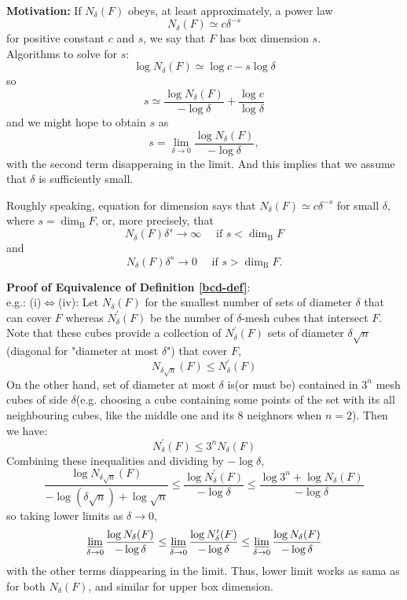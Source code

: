 \documentclass[12pt, a4paper]{article}
\begin{document}
\textbf{Motivation:}
If $N_\delta(F)$ obeys, at least approximately, a power law
$$N_{\delta}(F) \simeq c \delta^{-s}$$
for positive constant $c$ and $s$, we say that $F$ has box dimension $s$.
\\
Algorithms to solve for $s$:
$$
\log N_{\delta}(F) \simeq \log c-s \log \delta
$$
so
$$
s \simeq \frac{\log N_{\delta}(F)}{-\log \delta}+\frac{\log c}{\log \delta}
$$
and we might hope to obtain $s$ as
$$
s=\lim _{\delta \rightarrow 0} \frac{\log N_{\delta}(F)}{-\log \delta},
$$
with the second term disapperaing in the limit. And this implies that we assume that $\delta$ is sufficiently small. 


Roughly speaking, equation for dimension says that $N_{\delta}(F) \simeq c \delta^{-s}$ for small $\delta$, where $s=\operatorname{dim}_{\mathrm{B}} F$, or, more precisely, that
$$
N_{\delta}(F) \delta^{s} \rightarrow \infty \quad \text { if } s<\operatorname{dim}_{\mathrm{B}} F
$$
and
$$
N_{\delta}(F) \delta^{s} \rightarrow 0 \quad \text { if } s>\operatorname{dim}_{\mathrm{B}} F .
$$

\textbf{Proof of Equivalence of Definition \ref{bcd-def}}:\\
e.g.: (i)$\Leftrightarrow$(iv): Let $N_\delta(F)$ for the smallest number of sets of diameter $\delta$ that can cover $F$ whereas $N_\delta^\prime(F)$ be the number of $\delta$-mesh cubes that intersect $F$. 
Note that these cubes provide a collection of $N_\delta^\prime(F)$ sets of diameter $\delta\sqrt{n}$(diagonal for "diameter at most $\delta$") that cover $F$, $$N_{\delta\sqrt{n}}(F)\leq N_\delta^\prime(F)$$
On the other hand, set of diameter at most $\delta$ is(or must be) contained in $3^n$ mesh cubes of side $\delta$(e.g. choosing a cube containing some points of the set with its all neighbouring cubes, like the middle one and its 8 neighnors when $n=2$). Then we have:
$$ N_\delta^\prime(F) \leq 3^n N_\delta(F)$$
Combining these inequalities and dividing by $-\log \delta$,
$$
\frac{\log N_{\delta \sqrt{n}}(F)}{-\log (\delta \sqrt{n})+\log \sqrt{n}} \leq \frac{\log N_{\delta}^{\prime}(F)}{-\log \delta} \leq \frac{\log 3^{n}+\log N_{\delta}(F)}{-\log \delta}
$$
so taking lower limits as $\delta \rightarrow 0$,
$$\varliminf_{\delta \rightarrow 0} \frac{\log N_{\delta}(F)}{-\log \delta} \leq \varliminf_{\delta \rightarrow 0} \frac{\log N_{\delta}^{\prime}(F)}{-\log \delta} \leq \varliminf_{\delta \rightarrow 0} \frac{\log N_{\delta}(F)}{-\log \delta}$$
with the other terms diappearing in the limit. Thus, lower limit works as sama as for both $N_\delta(F)$, and similar for upper box dimension. 
\end{document}
